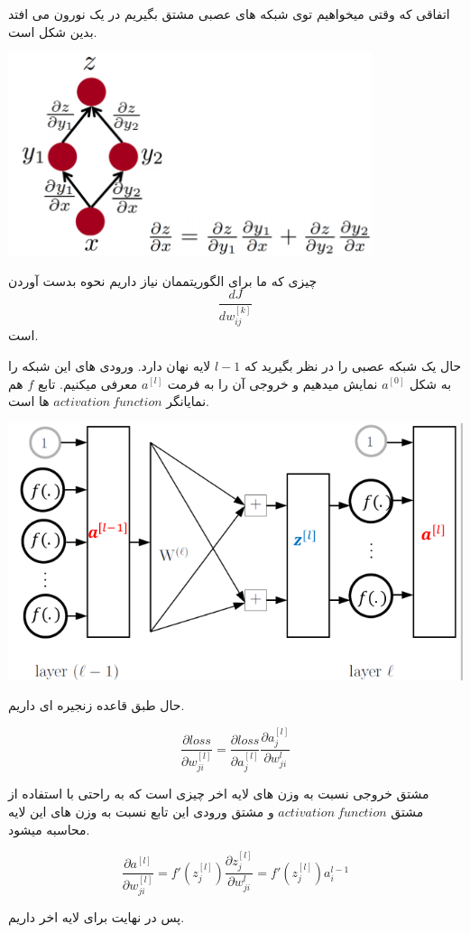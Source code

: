\documentclass[12pt]{article}
\begin{document}
اتفاقی که وقتی میخواهیم توی شبکه های عصبی مشتق بگیریم در یک نورون می افتد بدین شکل است.

\includegraphics[width= 0.8\textwidth]{figs/multipath_chainrule.png}

چیزی که ما برای الگوریتممان نیاز داریم نحوه بدست آوردن 
\[
\frac{dJ}{dw_{ij}^{[k]}}
\]
است.

حال یک شبکه عصبی را در نظر بگیرید که 
$l - 1$
لایه نهان دارد. ورودی های این شبکه را به شکل 
$a^{[0]}$
نمایش میدهیم و خروجی آن را به فرمت 
$a^{[l]}$
معرفی میکنیم. 
تابع 
$f$
هم نمایانگر 
$activation\:function$
ها است.

\includegraphics[width=0.8 \textwidth]{figs/img3.png}

حال طبق قاعده زنجیره ای داریم.

\[
\frac{\partial loss}{\partial w_{ji}^{[l]}} = \frac{\partial loss}{\partial a_{j}^{[l]}} \frac{\partial a_{j}^{[l]}}{\partial w_{ji}^{l}}
\]

مشتق خروجی نسبت به وزن های لایه اخر چیزی است که به راحتی با استفاده از مشتق 
$activation\:function$
و مشتق ورودی این تابع نسبت به وزن های این لایه محاسبه میشود.

\[
\frac{\partial a^{[l]}}{\partial w_{ji}^{[l]}} = f'(z_{j}^{[l]}) \frac{\partial z_{j}^{[l]}}{\partial w_{ji}^{l}} = f'(z_{j}^{[l]})a_{i}^{l - 1}
\]

پس در نهایت برای لایه اخر داریم.
\end{document}

